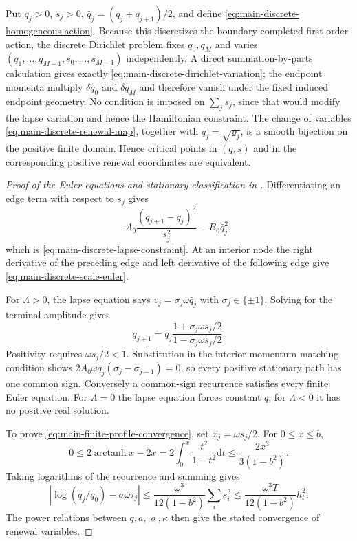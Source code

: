 \documentclass[11pt]{article}
\theoremstyle{definition}
\theoremstyle{remark}
\newcommand{\dd}{\mathrm d}
\begin{document}
Put $q_j>0$, $s_j>0$, $\bar q_j=(q_j+q_{j+1})/2$, and define
\eqref{eq:main-discrete-homogeneous-action}.  Because this discretizes the
boundary-completed first-order action, the discrete Dirichlet problem fixes
$q_0,q_M$ and varies $(q_1,\ldots,q_{M-1},s_0,\ldots,s_{M-1})$ independently.
A direct summation-by-parts calculation gives exactly
\eqref{eq:main-discrete-dirichlet-variation}; the endpoint momenta multiply
$\delta q_0$ and $\delta q_M$ and therefore vanish under the fixed induced
endpoint geometry.  No condition is imposed on $\sum_js_j$, since that would
modify the lapse variation and hence the Hamiltonian constraint.  The change of
variables \eqref{eq:main-discrete-renewal-map}, together with
$q_j=\sqrt{\varrho_j}$, is a smooth bijection on the positive finite domain.
Hence critical points in $(q,s)$ and in the corresponding positive renewal
coordinates are equivalent.

\begin{proof}[Proof of the Euler equations and stationary classification in
]
Differentiating an edge term with respect to $s_j$ gives
\[
 A_0\frac{(q_{j+1}-q_j)^2}{s_j^2}-B_0\bar q_j^2,
\]
which is \eqref{eq:main-discrete-lapse-constraint}.  At an interior node the
right derivative of the preceding edge and left derivative of the following
edge give \eqref{eq:main-discrete-scale-euler}.

For $\Lambda>0$, the lapse equation says
$v_j=\sigma_j\omega\bar q_j$ with $\sigma_j\in\{\pm1\}$.  Solving for the
terminal amplitude gives
\[
 q_{j+1}=q_j\frac{1+\sigma_j\omega s_j/2}
                      {1-\sigma_j\omega s_j/2}.
\]
Positivity requires $\omega s_j/2<1$.  Substitution in the interior momentum
matching condition shows
$2A_0\omega q_j(\sigma_j-\sigma_{j-1})=0$, so every positive stationary path
has one common sign.  Conversely a common-sign recurrence satisfies every
finite Euler equation.  For $\Lambda=0$ the lapse equation forces constant
$q$; for $\Lambda<0$ it has no positive real solution.

To prove \eqref{eq:main-finite-profile-convergence}, set
$x_j=\omega s_j/2$.  For $0\le x\le b$,
\[
 0\le2\operatorname{arctanh}x-2x
 =2\int_0^x\frac{t^2}{1-t^2}\dd t
 \le\frac{2x^3}{3(1-b^2)}.
\]
Taking logarithms of the recurrence and summing gives
\[
 \left|\log(q_j/q_0)-\sigma\omega\tau_j\right|
 \le\frac{\omega^3}{12(1-b^2)}\sum_i s_i^3
 \le\frac{\omega^3T}{12(1-b^2)}h_t^2.
\]
The power relations between $q,a,\varrho,\kappa$ then give the stated
convergence of renewal variables.
\end{proof}
\end{document}
